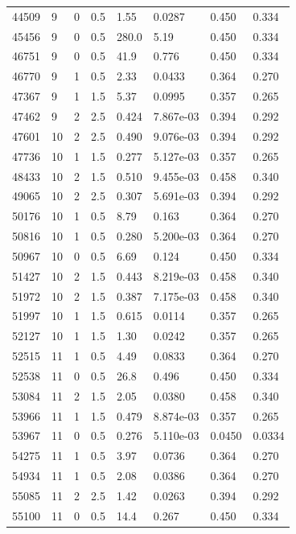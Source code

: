 \documentclass[preview]{standalone}
\begin{document}
{{{\begin{tabular}{L{1.2cm}C{1.2cm} C{0.3cm}C{0.5cm} C{1.4cm}C{1.4cm} C{1.4cm}C{1.4cm}}
  44509  &     9  & 0     & 0.5 &  1.55  & 0.0287  & 0.450 &  0.334   \\ 
  45456  &     9  & 0     & 0.5 &  280.0  & 5.19  & 0.450 &  0.334   \\ 
  46751  &     9  & 0     & 0.5 &  41.9  & 0.776  & 0.450 &  0.334   \\ 
  46770  &     9  & 1     & 0.5 &  2.33  & 0.0433  & 0.364 &  0.270   \\ 
  47367  &     9  & 1     & 1.5 &  5.37  & 0.0995  & 0.357 &  0.265   \\ 
  47462  &     9  & 2     & 2.5 &  0.424  & 7.867e-03  & 0.394 &  0.292   \\ 
  47601  &    10  & 2     & 2.5 &  0.490  & 9.076e-03  & 0.394 &  0.292   \\ 
  47736  &    10  & 1     & 1.5 &  0.277  & 5.127e-03  & 0.357 &  0.265   \\ 
  48433  &    10  & 2     & 1.5 &  0.510  & 9.455e-03  & 0.458 &  0.340   \\ 
  49065  &    10  & 2     & 2.5 &  0.307  & 5.691e-03  & 0.394 &  0.292   \\ 
  50176  &    10  & 1     & 0.5 &  8.79  & 0.163  & 0.364 &  0.270   \\ 
  50816  &    10  & 1     & 0.5 &  0.280  & 5.200e-03  & 0.364 &  0.270   \\ 
  50967  &    10  & 0     & 0.5 &  6.69  & 0.124  & 0.450 &  0.334   \\ 
  51427  &    10  & 2     & 1.5 &  0.443  & 8.219e-03  & 0.458 &  0.340   \\ 
  51972  &    10  & 2     & 1.5 &  0.387  & 7.175e-03  & 0.458 &  0.340   \\ 
  51997  &    10  & 1     & 1.5 &  0.615  & 0.0114  & 0.357 &  0.265   \\ 
  52127  &    10  & 1     & 1.5 &  1.30  & 0.0242  & 0.357 &  0.265   \\ 
  52515  &    11  & 1     & 0.5 &  4.49  & 0.0833  & 0.364 &  0.270   \\ 
  52538  &    11  & 0     & 0.5 &  26.8  & 0.496  & 0.450 &  0.334   \\ 
  53084  &    11  & 2     & 1.5 &  2.05  & 0.0380  & 0.458 &  0.340   \\ 
  53966  &    11  & 1     & 1.5 &  0.479  & 8.874e-03  & 0.357 &  0.265   \\ 
  53967  &    11  & 0     & 0.5 &  0.276  & 5.110e-03  & 0.0450 &  0.0334   \\ 
  54275  &    11  & 1     & 0.5 &  3.97  & 0.0736  & 0.364 &  0.270   \\ 
  54934  &    11  & 1     & 0.5 &  2.08  & 0.0386  & 0.364 &  0.270   \\ 
  55085  &    11  & 2     & 2.5 &  1.42  & 0.0263  & 0.394 &  0.292   \\ 
  55100  &    11  & 0     & 0.5 &  14.4  & 0.267  & 0.450 &  0.334   \\ 
\hline 
\end{tabular} 

}}}
\end{document}
